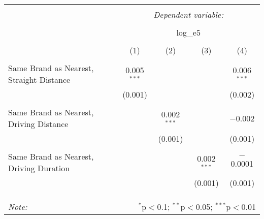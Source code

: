 
\begin{table}[!htbp] \centering 
  \caption{} 
  \label{} 
\begin{tabular}{@{\extracolsep{5pt}}lcccc} 
\\[-1.8ex]\hline 
\hline \\[-1.8ex] 
 & \multicolumn{4}{c}{\textit{Dependent variable:}} \\ 
\cline{2-5} 
\\[-1.8ex] & \multicolumn{4}{c}{log\_e5} \\ 
\\[-1.8ex] & (1) & (2) & (3) & (4)\\ 
\hline \\[-1.8ex] 
 Same Brand as Nearest, Straight Distance & 0.005$^{***}$ &  &  & 0.006$^{***}$ \\ 
  & (0.001) &  &  & (0.002) \\ 
  & & & & \\ 
 Same Brand as Nearest, Driving Distance &  & 0.002$^{***}$ &  & $-$0.002 \\ 
  &  & (0.001) &  & (0.001) \\ 
  & & & & \\ 
 Same Brand as Nearest, Driving Duration &  &  & 0.002$^{***}$ & $-$0.0001 \\ 
  &  &  & (0.001) & (0.001) \\ 
  & & & & \\ 
\hline \\[-1.8ex] 
\hline 
\hline \\[-1.8ex] 
\textit{Note:}  & \multicolumn{4}{r}{$^{*}$p$<$0.1; $^{**}$p$<$0.05; $^{***}$p$<$0.01} \\ 
\end{tabular} 
\end{table} 
